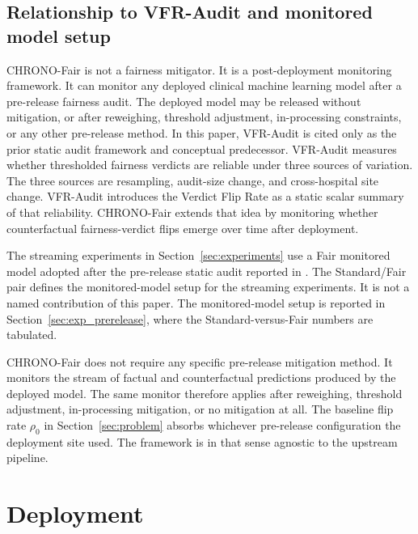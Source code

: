 \documentclass[acmsmall,nonacm,review,anonymous]{acmart}
\newcommand{\1}[1]{\mathbf{1}\!\left\{#1\right\}}
\begin{document}
\subsection{Relationship to VFR-Audit and monitored model setup}\label{sec:monitored_model}

CHRONO-Fair is not a fairness mitigator. It is a post-deployment monitoring framework. It can monitor any deployed clinical machine learning model after a pre-release fairness audit. The deployed model may be released without mitigation, or after reweighing, threshold adjustment, in-processing constraints, or any other pre-release method. In this paper, VFR-Audit \cite{joy2025vfr} is cited only as the prior static audit framework and conceptual predecessor. VFR-Audit measures whether thresholded fairness verdicts are reliable under three sources of variation. The three sources are resampling, audit-size change, and cross-hospital site change. VFR-Audit introduces the Verdict Flip Rate as a static scalar summary of that reliability. CHRONO-Fair extends that idea by monitoring whether counterfactual fairness-verdict flips emerge over time after deployment.

The streaming experiments in Section~\ref{sec:experiments} use a Fair monitored model adopted after the pre-release static audit reported in \cite{joy2025vfr}. The Standard/Fair pair defines the monitored-model setup for the streaming experiments. It is not a named contribution of this paper. The monitored-model setup is reported in Section~\ref{sec:exp_prerelease}, where the Standard-versus-Fair numbers are tabulated.

CHRONO-Fair does not require any specific pre-release mitigation method. It monitors the stream of factual and counterfactual predictions produced by the deployed model. The same monitor therefore applies after reweighing, threshold adjustment, in-processing mitigation, or no mitigation at all. The baseline flip rate $\rho_0$ in Section~\ref{sec:problem} absorbs whichever pre-release configuration the deployment site used. The framework is in that sense agnostic to the upstream pipeline.

\section{Deployment}\label{sec:deployment}
\end{document}

